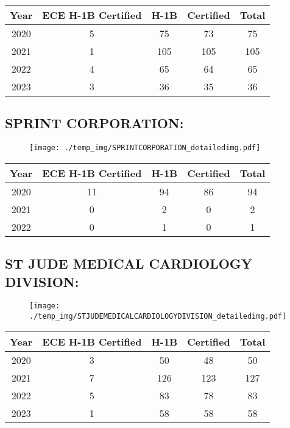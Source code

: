 \documentclass{article}%
\begin{document}
%
\begin{longtable}{c|c|c|c|c}%
\hline%
Year&ECE H{-}1B Certified&H{-}1B&Certified&Total\\%
\hline%
2020&5&75&73&75\\%
\hline%
2021&1&105&105&105\\%
\hline%
2022&4&65&64&65\\%
\hline%
2023&3&36&35&36\\%
\hline%
\end{longtable}

%
\newpage%
\subsection{SPRINT CORPORATION:}%
\label{subsec:SPRINTCORPORATION}%
\label{SPRINTCORPORATIONdetailed}%


\begin{figure}[htbp]%
\centering%
\texttt{[image: ./temp\_img/SPRINTCORPORATION\_detailedimg.pdf]}%
\end{figure}

%
\begin{longtable}{c|c|c|c|c}%
\hline%
Year&ECE H{-}1B Certified&H{-}1B&Certified&Total\\%
\hline%
2020&11&94&86&94\\%
\hline%
2021&0&2&0&2\\%
\hline%
2022&0&1&0&1\\%
\hline%
\end{longtable}

%
\newpage%
\subsection{ST JUDE MEDICAL CARDIOLOGY DIVISION:}%
\label{subsec:STJUDEMEDICALCARDIOLOGYDIVISION}%
\label{STJUDEMEDICALCARDIOLOGYDIVISIONdetailed}%


\begin{figure}[htbp]%
\centering%
\texttt{[image: ./temp\_img/STJUDEMEDICALCARDIOLOGYDIVISION\_detailedimg.pdf]}%
\end{figure}

%
\begin{longtable}{c|c|c|c|c}%
\hline%
Year&ECE H{-}1B Certified&H{-}1B&Certified&Total\\%
\hline%
2020&3&50&48&50\\%
\hline%
2021&7&126&123&127\\%
\hline%
2022&5&83&78&83\\%
\hline%
2023&1&58&58&58\\%
\hline%
\end{longtable}
\end{document}
